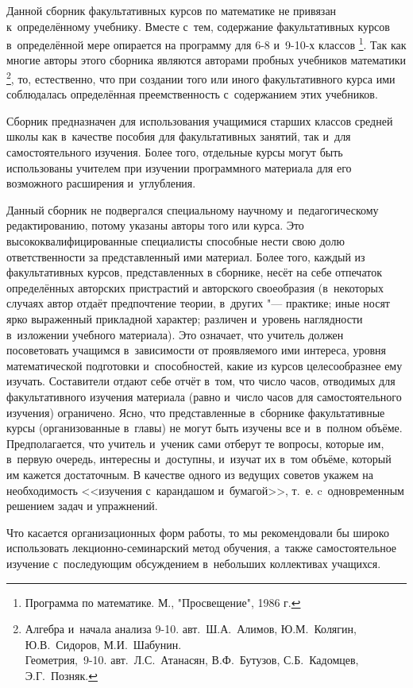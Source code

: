 Данной сборник факультативных курсов по математике не привязан
к~определённому учебнику. Вместе с~тем, содержание факультативных курсов
в~определённой мере опирается на программу для 6-8 и~9-10-х классов
\footnote{Программа по математике. М., "Просвещение", 1986 г.}.
Так как многие авторы этого сборника являются авторами
пробных учебников математики
\footnote{
Алгебра и~начала анализа 9-10.
авт.~Ш.А.~Алимов, Ю.М.~Колягин, Ю.В.~Сидоров, М.И.~Шабунин.\\
Геометрия,~9-10.
авт.~Л.С.~Атанасян, В.Ф.~Бутузов, С.Б.~Кадомцев, Э.Г.~Позняк.},
то, естественно, что при создании того или иного факультативного курса
ими соблюдалась определённая преемственность с~содержанием этих учебников.

Сборник предназначен для использования учащимися старших классов
средней школы как в~качестве пособия для факультативных занятий,
так и~для самостоятельного изучения. Более того, отдельные курсы
могут быть использованы учителем при изучении программного материала
для его возможного расширения и~углубления.

Данный сборник не подвергался специальному научному
и~педагогическому редактированию, потому указаны авторы того или курса.
Это высококвалифицированные специалисты способные нести свою долю
ответственности за представленный ими материал.
Более того, каждый из факультативных курсов, представленных в сборнике,
несёт на себе отпечаток определённых авторских пристрастий и авторского
своеобразия (в~некоторых случаях автор отдаёт предпочтение теории,
в~других "--- практике; иные носят ярко выраженный прикладной характер;
различен и~уровень наглядности в~изложении учебного материала).
Это означает, что учитель должен посоветовать учащимся в~зависимости от
проявляемого ими интереса, уровня математической подготовки и~способностей,
какие из курсов целесообразнее ему изучать.
Составители отдают себе отчёт в~том, что число часов, отводимых
для факультативного изучения материала (равно и~число часов для
самостоятельного изучения) ограничено. Ясно, что представленные в~сборнике
факультативные курсы (организованные в~главы) не могут быть изучены все 
и~в~полном объёме. Предполагается, что учитель и~ученик сами отберут
те вопросы, которые им, в~первую очередь, интересны и~доступны,
и~изучат их в~том объёме, который им кажется достаточным.
В качестве одного из ведущих советов укажем на необходимость
<<изучения с~карандашом и~бумагой>>,
т.~е. c~одновременным решением задач и упражнений.

Что касается организационных форм работы, то мы рекомендовали бы широко
использовать лекционно-семинарский метод обучения, а~также самостоятельное
изучение с~последующим обсуждением в~небольших коллективах учащихся.

